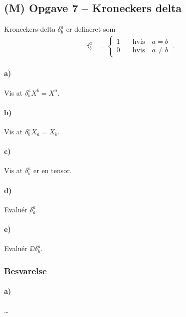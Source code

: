\documentclass[../main.tex]{subfiles}
\begin{document}

\subsection{(M) Opgave 7 -- Kroneckers delta}
\setcounter{subsection}{7}
\setcounter{equation}{0}

Kroneckers delta $\delta^a_b$ er defineret som
\begin{align}
    \delta^a_b &=
        \begin{cases}
            1 \quad & \text{hvis} \quad a = b \\
            0 \quad & \text{hvis} \quad a \ne b
        \end{cases} \: .
\end{align}

\paragraph{a)} Vis at $\delta^a_b X^b = X^a$.
\paragraph{b)} Vis at $\delta^a_b X_a = X_b$.
\paragraph{c)} Vis at $\delta^a_b$ er en tensor.
\paragraph{d)} Evaluér $\delta^a_a$.
\paragraph{e)} Evaluér $\DD \delta^a_b$.


\subsubsection*{Besvarelse}


\paragraph{a)}

\ldots


\end{document}

